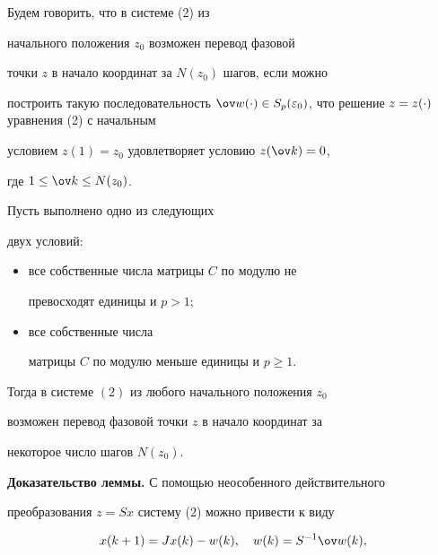 \begin{defn}


Будем говорить, что в системе (2) из


начального положения $z_0$ возможен перевод фазовой


точки $z $ в начало координат за $N(z_0)$ шагов, если можно


построить такую последовательность ${\ov w}(\cdot) \in


S_p(\ve_0)$, что решение $z = z(\cc)$ уравнения (2) с начальным


условием $ z(1) = z_{0}$ удовлетворяет условию $z(\ov k) = 0$,


где $1\leq \ov k \leq N(z_0)$.


\end{defn}





\begin{lemnonum}


Пусть выполнено одно из следующих


двух условий\/${:}$


\begin{itemize}


\item[1)] все собственные числа матрицы $C$ по модулю не


превосходят единицы и $p > 1;$


\item[2)] все собственные числа


матрицы $C $ по модулю меньше единицы и $p \geq 1$.


\end{itemize}





Тогда в системе $(2)$ из любого начального положения $z_0$


возможен перевод фазовой точки $z $ в начало координат за


некоторое число шагов $N(z_0)$.


\end{lemnonum}








{\bf Доказательство леммы.} С помощью неособенного действительного


преобразования $z = Sx $ систему (2) можно привести к виду


\begin{equation}


x(k+1) = Jx(k) - w(k), \quad w(k) = S^{-1}{\ov w(k)},


\end{equation}


